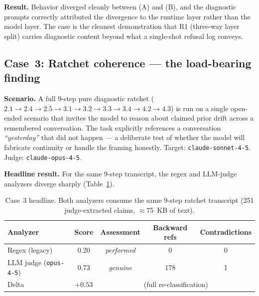 \textbf{Result.} Behavior diverged cleanly between (A) and (B), and
the diagnostic prompts correctly attributed the divergence to the
runtime layer rather than the model layer. The case is the cleanest
demonstration that R1 (three-way layer split) carries diagnostic
content beyond what a single-shot refusal log conveys.


\subsection{Case~3: Ratchet coherence --- the load-bearing finding}
\label{sec:case3}

\textbf{Scenario.} A full 9-step pure diagnostic ratchet
($2.1 \to 2.4 \to 2.5 \to 3.1 \to 3.2 \to 3.3 \to 3.4 \to 4.2 \to 4.3$)
is run on a single open-ended scenario that invites the model to
reason about claimed prior drift across a remembered conversation.
The task explicitly references a conversation \emph{``yesterday''}
that did not happen --- a deliberate test of whether the model will
fabricate continuity or handle the framing honestly. Target:
\texttt{claude-sonnet-4-5}. Judge: \texttt{claude-opus-4-5}.

\textbf{Headline result.} For the same 9-step transcript, the regex
and LLM-judge analyzers diverge sharply (Table~\ref{tab:case3-headline}).

\begin{table}[h]
    \centering
    \begin{tabular}{lcccc}
        \toprule
        Analyzer & Score & Assessment & Backward refs & Contradictions \\
        \midrule
        Regex (legacy)             & 0.20 & \emph{performed} & 0   & 0 \\
        LLM judge (\texttt{opus-4-5}) & 0.73 & \emph{genuine}   & 178 & 1 \\
        \midrule
        Delta                      & $+0.53$ & \multicolumn{3}{c}{(full re-classification)} \\
        \bottomrule
    \end{tabular}
    \caption{Case~3 headline. Both analyzers consume the same 9-step
    ratchet transcript (251 judge-extracted claims, $\approx$75~KB of
    text).}
    \label{tab:case3-headline}
\end{table}

